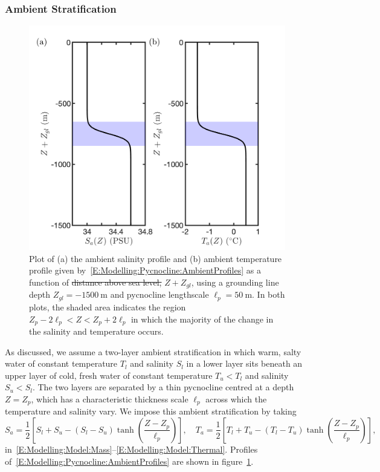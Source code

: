 \documentclass[openacc]{rsproca_new}%
\newcommand{\red}[1]{{\color{red} #1}}
\newcommand{\rout}[1]{\red{\st{#1}}}\newcommand{\ab}[1]{\textcolor{Green}{#1}}\newcommand{\about}[1]{\textcolor{Cyan}{\sout{#1}}}
\begin{document}
\subsubsection{Ambient Stratification}\label{S:Model:Pycnocline}
\begin{figure}
\centering
\includegraphics[scale =0.4]{./make_plots/plots/figure2.png}
\caption{Plot of (a) the ambient salinity profile and (b) ambient temperature profile given by~\eqref{E:Modelling:Pycnocline:AmbientProfiles} as a function of \rout{distance above sea level,} $Z + Z_{gl}$, using a grounding line depth $Z_{gl} = -1500~\si{\meter}$ and pycnocline lengthscale $\ell_p = 50~\si{\meter}$. In both plots, the shaded area indicates the region $Z_p - 2\ell_p < Z < Z_p + 2\ell_p$ in which the majority of the change in the salinity and temperature occurs.}\label{fig:Pycnocline_Profiles}
\end{figure}

As discussed, we assume a two-layer ambient stratification in which warm, salty water of constant temperature $T_l$ and salinity $S_l$ in a lower layer sits beneath an upper layer of cold, fresh water of constant temperature $T_u < T_l$ and salinity $S_u < S_l$. The two layers are separated by a thin pycnocline centred at a depth $Z = Z_p$, which has a characteristic thickness scale $\ell_p$ across which the temperature and salinity vary. We impose this ambient stratification by taking
\begin{equation}\label{E:Modelling:Pycnocline:AmbientProfiles}
S_a = \frac{1}{2}\left[S_l + S_u - (S_l - S_u)\tanh\left(\frac{Z - Z_p}{\ell_p}\right)\right], \quad
T_a = \frac{1}{2}\left[T_l + T_u - (T_l - T_u)\tanh\left(\frac{Z - Z_p}{\ell_p}\right)\right],
\end{equation} %
in~\eqref{E:Modelling:Model:Mass}--\eqref{E:Modelling:Model:Thermal}. Profiles of~\eqref{E:Modelling:Pycnocline:AmbientProfiles} are shown in figure~\ref{fig:Pycnocline_Profiles}. 
\end{document}
